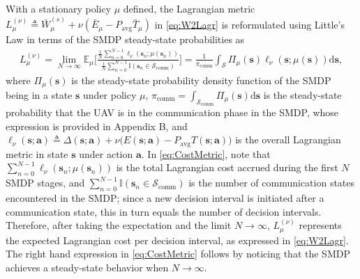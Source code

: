 \documentclass[12pt, draftcls, onecolumn]{IEEEtran}
\theoremstyle{plain}
\theoremstyle{definition}
\theoremstyle{remark}
\begin{document}
With a stationary policy $\mu$ defined, the Lagrangian metric $L_{\mu}^{(\nu)}{\triangleq}\bar{W}_{\mu}^{(s)}{+}\nu(\bar{E}_{\mu}{-}P_{\mathrm{avg}}\bar{T}_{\mu})$ in \eqref{eq:W2Lagr} is reformulated using Little's Law \cite{LittlesLaw} in terms of the SMDP steady-state probabilities as
\begin{align}\label{eq:CostMetric}
    L_\mu^{(\nu)}
    = \lim_{N \rightarrow \infty} \mathbb{E}_\mu \Bigg[ \frac{\frac{1}{N}\sum_{n=0}^{N-1}  \ell_\nu(\mathbf{s}_n; \mu(\mathbf{s}_n)) }{\frac{1}{N}\sum_{n = 0}^{N-1} \mathbb I(\mathbf{s}_n \in \mathcal{S}_{\mathrm{comm}})}  \Bigg]
    = \frac{1}{\pi_{\mathrm{comm}}}\int_{\mathcal{S}} \Pi_{\mu}(\mathbf{s})\ell_\nu(\mathbf{s}; \mu(\mathbf{s}))\mathrm{d}\mathbf{s},
\end{align}
where $\Pi_{\mu}(\mathbf{s})$ is the steady-state probability density function of the SMDP being in a state $\mathbf{s}$ under policy $\mu$, $\pi_{\mathrm{comm}}{=}\int_{\mathcal{S}_{\mathrm{comm}}}\!\!\!\!\!\Pi_{\mu}(\mathbf{s})\mathrm{d}\mathbf{s}$ is the steady-state probability that the UAV is in the communication phase in the SMDP, whose expression is provided in Appendix B, and $\ell_{\nu}(\mathbf{s};\mathbf{a}) \triangleq \Delta(\mathbf{s};\mathbf{a}){+}\nu\big(E(\mathbf{s};\mathbf{a}){-}P_{\mathrm{avg}}T(\mathbf{s};\mathbf{a})\big)$ is the overall Lagrangian metric in state $\mathbf{s}$ under action $\mathbf{a}$. In \eqref{eq:CostMetric}, note that $\sum_{n=0}^{N{-}1}\ell_{\nu}(\mathbf{s}_{n};\mu(\mathbf{s}_{n}))$ is the total Lagrangian cost accrued during the first $N$ SMDP stages, and $\sum_{n{=}0}^{N{-}1}\mathbb{I}(\mathbf{s}_{n}{\in}\mathcal{S}_{\mathrm{comm}})$ is the number of communication states encountered in the SMDP; since a new decision interval is initiated after a communication state, this in turn equals the number of decision intervals. Therefore, after taking the expectation and the limit $N{\to}\infty$, $L_{\mu}^{(\nu)}$ represents the expected Lagrangian cost per decision interval, as expressed in \eqref{eq:W2Lagr}. The right hand expression in \eqref{eq:CostMetric} follows by noticing that the SMDP achieves a steady-state behavior when $N\to\infty$.
\end{document}
